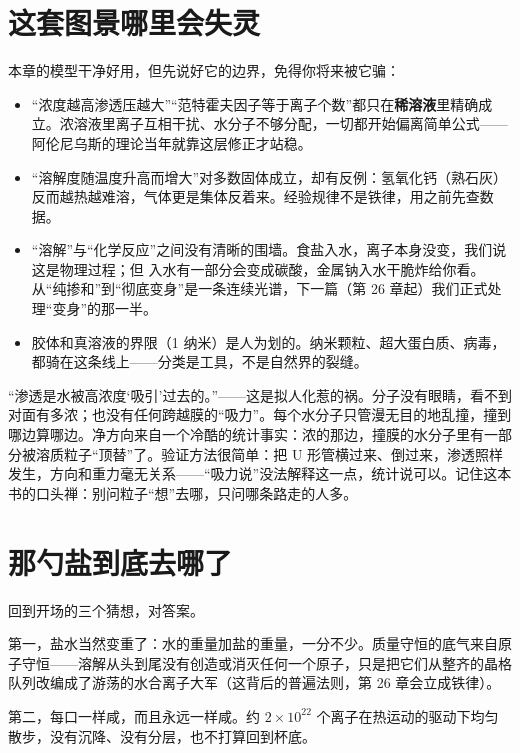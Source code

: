 \section{这套图景哪里会失灵}

本章的模型干净好用，但先说好它的边界，免得你将来被它骗：

\begin{itemize}[itemsep=2pt]
\item “浓度越高渗透压越大”“范特霍夫因子等于离子个数”都只在\textbf{稀溶液}里精确成立。浓溶液里离子互相干扰、水分子不够分配，一切都开始偏离简单公式——阿伦尼乌斯的理论当年就靠这层修正才站稳。
\item “溶解度随温度升高而增大”对多数固体成立，却有反例：氢氧化钙（熟石灰）反而越热越难溶，气体更是集体反着来。经验规律不是铁律，用之前先查数据。
\item “溶解”与“化学反应”之间没有清晰的围墙。食盐入水，离子本身没变，我们说这是物理过程；但  入水有一部分会变成碳酸，金属钠入水干脆炸给你看。从“纯掺和”到“彻底变身”是一条连续光谱，下一篇（第 26 章起）我们正式处理“变身”的那一半。
\item 胶体和真溶液的界限（1 纳米）是人为划的。纳米颗粒、超大蛋白质、病毒，都骑在这条线上——分类是工具，不是自然界的裂缝。
\end{itemize}

\begin{wuqu}
“渗透是水被高浓度‘吸引’过去的。”——这是拟人化惹的祸。分子没有眼睛，看不到对面有多浓；也没有任何跨越膜的“吸力”。每个水分子只管漫无目的地乱撞，撞到哪边算哪边。净方向来自一个冷酷的统计事实：浓的那边，撞膜的水分子里有一部分被溶质粒子“顶替”了。验证方法很简单：把 U 形管横过来、倒过来，渗透照样发生，方向和重力毫无关系——“吸力说”没法解释这一点，统计说可以。记住这本书的口头禅：别问粒子“想”去哪，只问哪条路走的人多。
\end{wuqu}

\section{那勺盐到底去哪了}

回到开场的三个猜想，对答案。

第一，盐水当然变重了：水的重量加盐的重量，一分不少。质量守恒的底气来自原子守恒——溶解从头到尾没有创造或消灭任何一个原子，只是把它们从整齐的晶格队列改编成了游荡的水合离子大军（这背后的普遍法则，第 26 章会立成铁律）。

第二，每口一样咸，而且永远一样咸。约 $2\times 10^{22}$ 个离子在热运动的驱动下均匀散步，没有沉降、没有分层，也不打算回到杯底。

